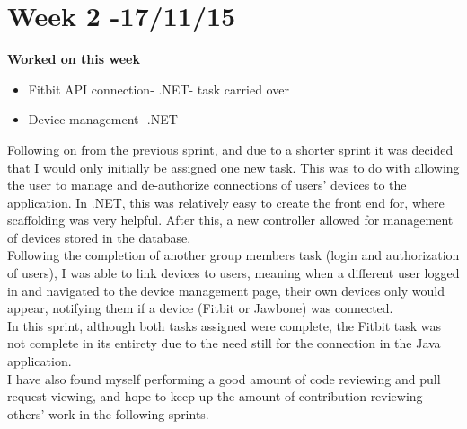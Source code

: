 \section{Week 2 -17/11/15}
\textbf{Worked on this week}
\begin{itemize}
\item Fitbit API connection- .NET- task carried over
\item Device management- .NET
\end{itemize}
Following on from the previous sprint, and due to a shorter sprint it was decided that I would only initially be assigned one new task. This was to do with allowing the user to manage and de-authorize connections of users' devices to the application. In .NET, this was relatively easy to create the front end for, where scaffolding was very helpful. After this, a new controller allowed for management of devices stored in the database.\\
Following the completion of another group members task (login and authorization of users), I was able to link devices to users, meaning when a different user logged in and navigated to the device management page, their own devices only would appear, notifying them if a device (Fitbit or Jawbone) was connected.\\
In this sprint, although both tasks assigned were complete, the Fitbit task was not complete in its entirety due to the need still for the connection in the Java application.\\
I have also found myself performing a good amount of code reviewing and pull request viewing, and hope to keep up the amount of contribution reviewing others' work in the following sprints.


